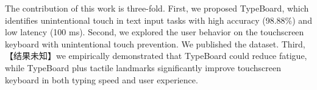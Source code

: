 
The contribution of this work is three-fold. First, we proposed TypeBoard, which identifies unintentional touch in text input tasks with high accuracy (98.88\%) and low latency (100 ms). Second, we explored the user behavior on the touchscreen keyboard with unintentional touch prevention. We published the dataset. Third, 【结果未知】we empirically demonstrated that TypeBoard could reduce fatigue, while TypeBoard plus tactile landmarks significantly improve touchscreen keyboard in both typing speed and user experience.

